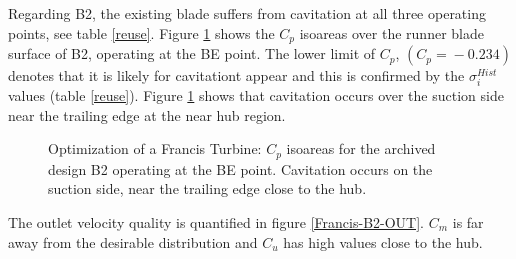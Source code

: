 \FloatBarrier
Regarding B2, the existing blade suffers from cavitation at all three operating points, see table \ref{reuse}. Figure \ref{Francis-B2-BE} shows the $C_p$ isoareas over the runner blade surface of B2, operating at the BE point. The lower limit of $C_p$, $(C_p\!=\!-0.234)$ denotes that it is likely for cavitationt appear and this is confirmed by the $\sigma_i^{Hist}$ values (table \ref{reuse}). Figure \ref{Francis-B2-BE} shows that cavitation occurs over the suction side near the trailing edge at the near hub region.     


\begin{figure}[h!]
\begin{minipage}[b]{1\linewidth}
 \centering
\end{minipage}
\caption{Optimization of a Francis Turbine: $C_p$ isoareas for the archived design B2 operating at the BE point. Cavitation occurs on the suction side, near the trailing edge close to the hub.}
\label{Francis-B2-BE}
\end{figure}

The outlet velocity quality is quantified in figure \ref{Francis-B2-OUT}. $C_m$ is far away from the desirable distribution and $C_u$ has high values close to the hub.   

